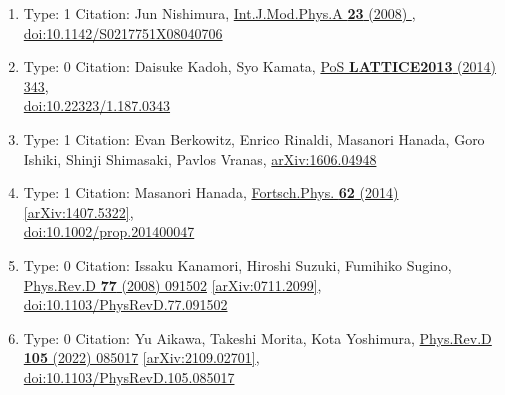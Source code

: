 \documentclass[a4paper,10pt]{article}
\begin{document}
\begin{enumerate}
\begin{enumerate}
  \item Type: 1 Citation: Jun Nishimura, \href{https://www.doi.org/10.1142/S0217751X08040706}{Int.J.Mod.Phys.A {\bf 23} (2008) },\\\href{https://www.doi.org/10.1142/S0217751X08040706}{doi:10.1142/S0217751X08040706}
  \item Type: 0 Citation: Daisuke Kadoh, Syo Kamata, \href{https://www.doi.org/10.22323/1.187.0343}{PoS {\bf LATTICE2013} (2014) 343},\\\href{https://www.doi.org/10.22323/1.187.0343}{doi:10.22323/1.187.0343}
  \item Type: 1 Citation: Evan Berkowitz, Enrico Rinaldi, Masanori Hanada, Goro Ishiki, Shinji Shimasaki, Pavlos Vranas, \href{https://arxiv.org/abs/1606.04948}{arXiv:1606.04948}
  \item Type: 1 Citation: Masanori Hanada, \href{https://www.doi.org/10.1002/prop.201400047}{Fortsch.Phys. {\bf 62} (2014) }  \href{https://arxiv.org/abs/1407.5322}{[arXiv:1407.5322]},\\\href{https://www.doi.org/10.1002/prop.201400047}{doi:10.1002/prop.201400047}
  \item Type: 0 Citation: Issaku Kanamori, Hiroshi Suzuki, Fumihiko Sugino, \href{https://www.doi.org/10.1103/PhysRevD.77.091502}{Phys.Rev.D {\bf 77} (2008) 091502}  \href{https://arxiv.org/abs/0711.2099}{[arXiv:0711.2099]},\\\href{https://www.doi.org/10.1103/PhysRevD.77.091502}{doi:10.1103/PhysRevD.77.091502}
  \item Type: 0 Citation: Yu Aikawa, Takeshi Morita, Kota Yoshimura, \href{https://www.doi.org/10.1103/PhysRevD.105.085017}{Phys.Rev.D {\bf 105} (2022) 085017}  \href{https://arxiv.org/abs/2109.02701}{[arXiv:2109.02701]},\\\href{https://www.doi.org/10.1103/PhysRevD.105.085017}{doi:10.1103/PhysRevD.105.085017}

\end{enumerate}
\end{enumerate}
\end{document}

